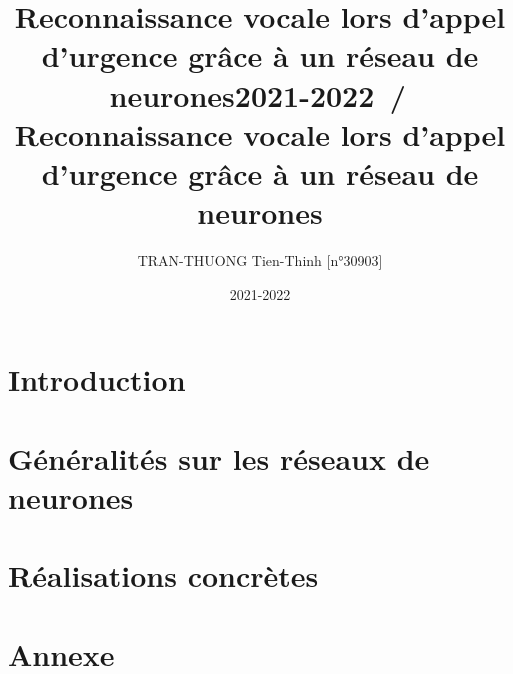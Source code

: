 \documentclass[10pt]{beamer}
\author{TRAN-THUONG Tien-Thinh [n°30903]}
\date{2021-2022}
\title{Reconnaissance vocale lors d’appel d’urgence grâce à un réseau de neurones}
\title{2021-2022 \hspace{15em} \insertframenumber\,/\,\inserttotalframenumber}
\begin{document}
\begin{frame}
    \title{Reconnaissance vocale lors d’appel d’urgence grâce à un réseau
        de neurones}
    \titlepage
\end{frame}

\section{Introduction}



\section{Généralités sur les réseaux de neurones}




\section{Réalisations concrètes}





\section{Annexe}



\end{document}
